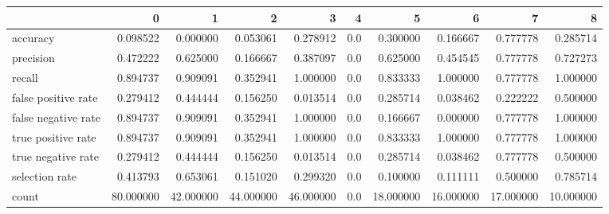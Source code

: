 \begin{tabular}{lrrrrrrrrr}
\toprule
{} &          0 &          1 &          2 &          3 &    4 &          5 &          6 &          7 &          8 \\
\midrule
accuracy            &   0.098522 &   0.000000 &   0.053061 &   0.278912 &  0.0 &   0.300000 &   0.166667 &   0.777778 &   0.285714 \\
precision           &   0.472222 &   0.625000 &   0.166667 &   0.387097 &  0.0 &   0.625000 &   0.454545 &   0.777778 &   0.727273 \\
recall              &   0.894737 &   0.909091 &   0.352941 &   1.000000 &  0.0 &   0.833333 &   1.000000 &   0.777778 &   1.000000 \\
false positive rate &   0.279412 &   0.444444 &   0.156250 &   0.013514 &  0.0 &   0.285714 &   0.038462 &   0.222222 &   0.500000 \\
false negative rate &   0.894737 &   0.909091 &   0.352941 &   1.000000 &  0.0 &   0.166667 &   0.000000 &   0.777778 &   1.000000 \\
true positive rate  &   0.894737 &   0.909091 &   0.352941 &   1.000000 &  0.0 &   0.833333 &   1.000000 &   0.777778 &   1.000000 \\
true negative rate  &   0.279412 &   0.444444 &   0.156250 &   0.013514 &  0.0 &   0.285714 &   0.038462 &   0.777778 &   0.500000 \\
selection rate      &   0.413793 &   0.653061 &   0.151020 &   0.299320 &  0.0 &   0.100000 &   0.111111 &   0.500000 &   0.785714 \\
count               &  80.000000 &  42.000000 &  44.000000 &  46.000000 &  0.0 &  18.000000 &  16.000000 &  17.000000 &  10.000000 \\
\bottomrule
\end{tabular}
